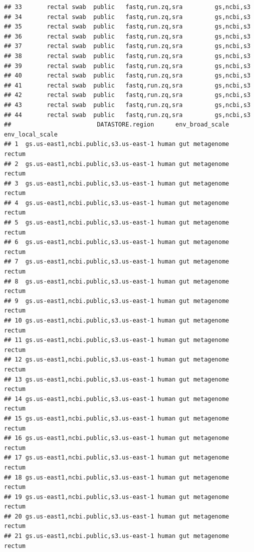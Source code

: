 \documentclass[
]{article}
\begin{document}
\begin{verbatim}
## 33       rectal swab  public   fastq,run.zq,sra         gs,ncbi,s3
## 34       rectal swab  public   fastq,run.zq,sra         gs,ncbi,s3
## 35       rectal swab  public   fastq,run.zq,sra         gs,ncbi,s3
## 36       rectal swab  public   fastq,run.zq,sra         gs,ncbi,s3
## 37       rectal swab  public   fastq,run.zq,sra         gs,ncbi,s3
## 38       rectal swab  public   fastq,run.zq,sra         gs,ncbi,s3
## 39       rectal swab  public   fastq,run.zq,sra         gs,ncbi,s3
## 40       rectal swab  public   fastq,run.zq,sra         gs,ncbi,s3
## 41       rectal swab  public   fastq,run.zq,sra         gs,ncbi,s3
## 42       rectal swab  public   fastq,run.zq,sra         gs,ncbi,s3
## 43       rectal swab  public   fastq,run.zq,sra         gs,ncbi,s3
## 44       rectal swab  public   fastq,run.zq,sra         gs,ncbi,s3
##                        DATASTORE.region      env_broad_scale env_local_scale
## 1  gs.us-east1,ncbi.public,s3.us-east-1 human gut metagenome          rectum
## 2  gs.us-east1,ncbi.public,s3.us-east-1 human gut metagenome          rectum
## 3  gs.us-east1,ncbi.public,s3.us-east-1 human gut metagenome          rectum
## 4  gs.us-east1,ncbi.public,s3.us-east-1 human gut metagenome          rectum
## 5  gs.us-east1,ncbi.public,s3.us-east-1 human gut metagenome          rectum
## 6  gs.us-east1,ncbi.public,s3.us-east-1 human gut metagenome          rectum
## 7  gs.us-east1,ncbi.public,s3.us-east-1 human gut metagenome          rectum
## 8  gs.us-east1,ncbi.public,s3.us-east-1 human gut metagenome          rectum
## 9  gs.us-east1,ncbi.public,s3.us-east-1 human gut metagenome          rectum
## 10 gs.us-east1,ncbi.public,s3.us-east-1 human gut metagenome          rectum
## 11 gs.us-east1,ncbi.public,s3.us-east-1 human gut metagenome          rectum
## 12 gs.us-east1,ncbi.public,s3.us-east-1 human gut metagenome          rectum
## 13 gs.us-east1,ncbi.public,s3.us-east-1 human gut metagenome          rectum
## 14 gs.us-east1,ncbi.public,s3.us-east-1 human gut metagenome          rectum
## 15 gs.us-east1,ncbi.public,s3.us-east-1 human gut metagenome          rectum
## 16 gs.us-east1,ncbi.public,s3.us-east-1 human gut metagenome          rectum
## 17 gs.us-east1,ncbi.public,s3.us-east-1 human gut metagenome          rectum
## 18 gs.us-east1,ncbi.public,s3.us-east-1 human gut metagenome          rectum
## 19 gs.us-east1,ncbi.public,s3.us-east-1 human gut metagenome          rectum
## 20 gs.us-east1,ncbi.public,s3.us-east-1 human gut metagenome          rectum
## 21 gs.us-east1,ncbi.public,s3.us-east-1 human gut metagenome          rectum

\end{verbatim}
\end{document}
